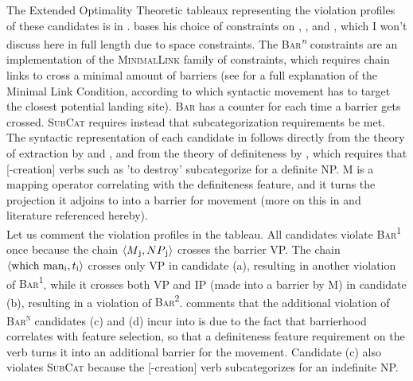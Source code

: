 The Extended Optimality Theoretic tableaux representing the violation profiles of these candidates is in . \textcite{keller1997extraction} bases his choice of constraints on \textcite{diesing1992indefinites}, \textcite{legendre1995optimality}, and \textcite{legendre1998less}, which I won't discuss here in full length due to space constraints. The \textsc{Bar}\textsuperscript{\textit{n}} constraints are an implementation of the \textsc{MinimalLink} family of constraints, which requires chain links to cross a minimal amount of barriers (see \textcite{chomsky1993minimalist} for a full explanation of the Minimal Link Condition, according to which syntactic movement has to target the closest potential landing site). \textsc{Bar} has a counter for each time a barrier gets crossed. \textsc{SubCat} requires instead that subcategorization requirements be met. The syntactic representation of each candidate in  follows directly from the theory of extraction by \textcite{legendre1995optimality} and \textcite{legendre1998less}, and from the theory of definiteness by \textcite{diesing1992indefinites}, which requires that [-creation] verbs such as 'to destroy' subcategorize for a definite NP. M is a mapping operator correlating with the definiteness feature, and it turns the projection it adjoins to into a barrier for movement (more on this in \textcite[11]{keller1997extraction} and literature referenced hereby).\\
Let us comment the violation profiles in the tableau. All candidates violate \textsc{Bar\textsuperscript{1}} once because the chain $\langle M\textsubscript{j}, NP\textsubscript{j} \rangle$ crosses the barrier VP. The chain $\langle \text{which man}\textsubscript{i}, t\textsubscript{i} \rangle$ crosses only VP in candidate (a), resulting in another violation of \textsc{Bar\textsuperscript{1}}, while it crosses both VP and IP (made into a barrier by M) in candidate (b), resulting in a violation of \textsc{Bar\textsuperscript{2}}. \textcite{keller1997extraction} comments that the additional violation of \textsc{Bar\textsuperscript{n}} candidates (c) and (d) incur into is due to the fact that barrierhood correlates with feature selection, so that a definiteness feature requirement on the verb turns it into an additional barrier for the movement. Candidate (c) also violates \textsc{SubCat} because the [-creation] verb subcategorizes for an indefinite NP.


